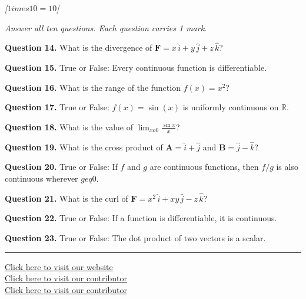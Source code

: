 \documentclass[11pt,a4paper]{article}
\newcommand{\pts}[1]{\hfill   \textit{[#1]}}
\begin{document}
\pts{$1 imes10=10$}

\medskip


\noindent   \textit{Answer all ten questions. Each question carries 1 mark.}

\bigskip




\noindent   \textbf{Question 14.} What is the divergence of $\mathbf{F} = x\,\hat{i} + y\,\hat{j} + z\,\hat{k}$?

\medskip



\noindent   \textbf{Question 15.} True or False: Every continuous function is differentiable.

\medskip



\noindent   \textbf{Question 16.} What is the range of the function $f(x) = x^2$?

\medskip



\noindent   \textbf{Question 17.} True or False: $f(x) = \sin(x)$ is uniformly continuous on $\mathbb{R}$.

\medskip



\noindent   \textbf{Question 18.} What is the value of $\displaystyle\lim_{x  o 0} \frac{\sin x}{x}$?

\medskip



\noindent   \textbf{Question 19.} What is the cross product of $\mathbf{A} = \hat{i} + \hat{j}$ and $\mathbf{B} = \hat{j} - \hat{k}$?

\medskip



\noindent   \textbf{Question 20.} True or False: If $f$ and $g$ are continuous functions, then $f/g$ is also continuous wherever $g 
eq 0$.

\medskip



\noindent   \textbf{Question 21.} What is the curl of $\mathbf{F} = x^2\,\hat{i} + xy\,\hat{j} - z\,\hat{k}$?

\medskip



\noindent   \textbf{Question 22.} True or False: If a function is differentiable, it is continuous.

\medskip



\noindent   \textbf{Question 23.} True or False: The dot product of two vectors is a scalar.

\vfill
\rule{\linewidth}{0.4pt}

\begin{center}\small
\href{https://bhu-exam.vercel.app/}{Click here to visit our website}\\[4pt]\href{https://me-aryan.vercel.app/}{Click here to visit our contributor}\\[4pt]\href{https://quashan-me.vercel.app/}{Click here to visit our contributor}
\end{center}
\end{document}
